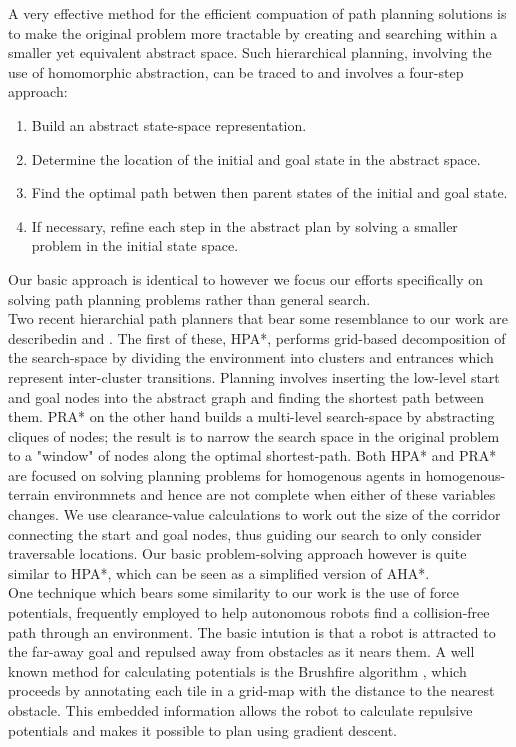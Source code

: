 A very effective method for the efficient compuation of path planning solutions is to make the original problem more tractable by creating and searching within a smaller yet equivalent abstract space. Such hierarchical planning, involving the use of homomorphic abstraction, can be traced to \cite{holte96} and involves a four-step approach:
\begin{enumerate}
\item{Build an abstract state-space representation.}
\item{Determine the location of the initial and goal state in the abstract space.}
\item{Find the optimal path betwen then parent states of the initial and goal state. }
\item{If necessary, refine each step in the abstract plan by solving a smaller problem in the initial state space.}
\end{enumerate}
Our basic approach is identical to \cite{holte96} however we focus our efforts specifically on solving path planning problems rather than general search. \\ \newline 
Two recent hierarchial path planners that bear some resemblance to our work are describedin \cite{botea04} and \cite{sturtevant05}. The first of these, HPA*, performs grid-based decomposition of the search-space by dividing the environment into clusters and entrances which represent inter-cluster transitions. Planning involves inserting the low-level start and goal nodes into the abstract graph and finding the shortest path between them. 
PRA* on the other hand builds a multi-level search-space by abstracting cliques of nodes; the result is to narrow the search space in the original problem to a "window" of nodes along the optimal shortest-path.\newline
Both HPA* and PRA* are focused on solving planning problems for homogenous agents in homogenous-terrain environmnets and hence are not complete when either of these variables changes. We use clearance-value calculations to work out the size of the corridor connecting the start and goal nodes, thus guiding our search to only consider traversable locations. Our basic problem-solving approach however is quite similar to HPA*, which can be seen as a simplified version of AHA*. \\ \newline
One technique which bears some similarity to our work is the use of force potentials, frequently employed to help autonomous robots find a collision-free path through an environment. The basic intution is that a robot is attracted to the far-away goal and repulsed away from obstacles as it nears them. A well known method for calculating potentials is the Brushfire algorithm \cite{latombe91}, which proceeds by annotating each tile in a grid-map with the distance to the nearest obstacle. This embedded information allows the robot to calculate repulsive potentials and makes it possible to plan using gradient descent. \newline
